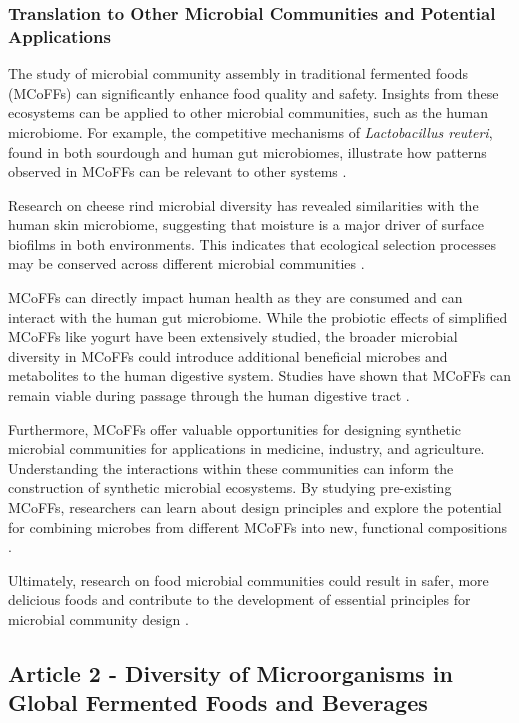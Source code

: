 \subsubsection*{Translation to Other Microbial Communities and Potential Applications}
The study of microbial community assembly in traditional fermented foods (MCoFFs) can significantly enhance food quality and safety. Insights from these ecosystems can be applied to other microbial communities, such as the human microbiome. For example, the competitive mechanisms of \textit{Lactobacillus reuteri}, found in both sourdough and human gut microbiomes, illustrate how patterns observed in MCoFFs can be relevant to other systems \cite*{L1-FermentedFoods}.

Research on cheese rind microbial diversity has revealed similarities with the human skin microbiome, suggesting that moisture is a major driver of surface biofilms in both environments. This indicates that ecological selection processes may be conserved across different microbial communities \cite*{L1-FermentedFoods}.

MCoFFs can directly impact human health as they are consumed and can interact with the human gut microbiome. While the probiotic effects of simplified MCoFFs like yogurt have been extensively studied, the broader microbial diversity in MCoFFs could introduce additional beneficial microbes and metabolites to the human digestive system. Studies have shown that MCoFFs can remain viable during passage through the human digestive tract \cite*{L1-FermentedFoods}.

Furthermore, MCoFFs offer valuable opportunities for designing synthetic microbial communities for applications in medicine, industry, and agriculture. Understanding the interactions within these communities can inform the construction of synthetic microbial ecosystems. By studying pre-existing MCoFFs, researchers can learn about design principles and explore the potential for combining microbes from different MCoFFs into new, functional compositions \cite*{L1-FermentedFoods}. 

Ultimately, research on food microbial communities could result in safer, more delicious foods and contribute to the development of essential principles for microbial community design \cite*{L1-FermentedFoods}.

\subsection{Article 2 - Diversity of Microorganisms in Global Fermented Foods and Beverages}    

